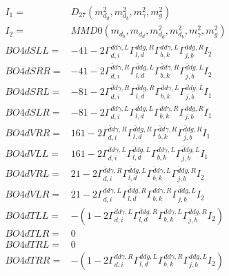 \documentclass[A4,landscape]{article}
\begin{document}
\begin{align} 
I_1 = & D_{27}(m^2_{d_{{d}}}, m^2_{d_{{b}}}, m^2_{\gamma}, m^2_{g}) \\ 
I_2 = & MMD0(m_{d_{{b}}}, m_{d_{{d}}}, m^2_{d_{{d}}}, m^2_{d_{{b}}}, m^2_{\gamma}, m^2_{g}) \\ 
  BO4dSLL= & -4 1
-
2 \Gamma^{\bar{d}d \gamma ,L}_{d, i} \Gamma^{\bar{d}d g ,R}_{l, d} \Gamma^{\bar{d}d \gamma ,L}_{b, k} \Gamma^{\bar{d}d g ,R}_{j, b} I_2 \\ 
  BO4dSRR= & -4 1
-
2 \Gamma^{\bar{d}d \gamma ,R}_{d, i} \Gamma^{\bar{d}d g ,L}_{l, d} \Gamma^{\bar{d}d \gamma ,R}_{b, k} \Gamma^{\bar{d}d g ,L}_{j, b} I_2 \\ 
  BO4dSRL= & -8 1
-
2 \Gamma^{\bar{d}d \gamma ,R}_{d, i} \Gamma^{\bar{d}d g ,R}_{l, d} \Gamma^{\bar{d}d \gamma ,L}_{b, k} \Gamma^{\bar{d}d g ,L}_{j, b} I_1 \\ 
  BO4dSLR= & -8 1
-
2 \Gamma^{\bar{d}d \gamma ,L}_{d, i} \Gamma^{\bar{d}d g ,L}_{l, d} \Gamma^{\bar{d}d \gamma ,R}_{b, k} \Gamma^{\bar{d}d g ,R}_{j, b} I_1 \\ 
  BO4dVRR= & 16 1
-
2 \Gamma^{\bar{d}d \gamma ,R}_{d, i} \Gamma^{\bar{d}d g ,R}_{l, d} \Gamma^{\bar{d}d \gamma ,R}_{b, k} \Gamma^{\bar{d}d g ,R}_{j, b} I_1 \\ 
  BO4dVLL= & 16 1
-
2 \Gamma^{\bar{d}d \gamma ,L}_{d, i} \Gamma^{\bar{d}d g ,L}_{l, d} \Gamma^{\bar{d}d \gamma ,L}_{b, k} \Gamma^{\bar{d}d g ,L}_{j, b} I_1 \\ 
  BO4dVRL= & 2 1
-
2 \Gamma^{\bar{d}d \gamma ,R}_{d, i} \Gamma^{\bar{d}d g ,L}_{l, d} \Gamma^{\bar{d}d \gamma ,L}_{b, k} \Gamma^{\bar{d}d g ,R}_{j, b} I_2 \\ 
  BO4dVLR= & 2 1
-
2 \Gamma^{\bar{d}d \gamma ,L}_{d, i} \Gamma^{\bar{d}d g ,R}_{l, d} \Gamma^{\bar{d}d \gamma ,R}_{b, k} \Gamma^{\bar{d}d g ,L}_{j, b} I_2 \\ 
  BO4dTLL= & -(1
-
2 \Gamma^{\bar{d}d \gamma ,L}_{d, i} \Gamma^{\bar{d}d g ,R}_{l, d} \Gamma^{\bar{d}d \gamma ,L}_{b, k} \Gamma^{\bar{d}d g ,R}_{j, b} I_2) \\ 
  BO4dTLR= & 0 \\ 
  BO4dTRL= & 0 \\ 
  BO4dTRR= & -(1
-
2 \Gamma^{\bar{d}d \gamma ,R}_{d, i} \Gamma^{\bar{d}d g ,L}_{l, d} \Gamma^{\bar{d}d \gamma ,R}_{b, k} \Gamma^{\bar{d}d g ,L}_{j, b} I_2) \\ 
\end{align} 
\end{document}
